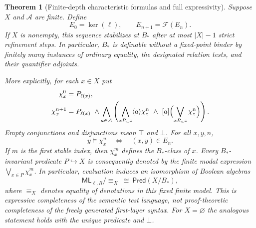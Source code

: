 \documentclass[11pt,a4paper]{article}
\numberwithin{equation}{section}
\newtheorem{theorem}{Theorem}[section]
\theoremstyle{definition}
\theoremstyle{remark}
\theoremstyle{plain}
\begin{document}
\begin{theorem}[Finite-depth characteristic formulas and full expressivity]
\label{thm:egt-finite-modal-completeness}
Suppose $X$ and $\mathcal A$ are finite. Define
\[
 E_0=\ker(\ell),\qquad E_{n+1}=\mathcal F(E_n).
\]
If $X$ is nonempty, this sequence stabilizes at $B_*$ after at most
$|X|-1$ strict refinement steps. In particular, $B_*$ is definable
without a fixed-point binder by finitely many instances of ordinary
equality, the designated relation tests, and their quantifier adjoints.

More explicitly, for each $x\in X$ put
\begin{align*}
 \chi_x^0&=P_{\ell(x)},\\
 \chi_x^{n+1}
 &=P_{\ell(x)}\ \wedge
 \bigwedge_{a\in\mathcal A}
 \left(
   \bigwedge_{xR_az}\langle a\rangle\chi_z^n
   \ \wedge\
   [a]\Bigl(\bigvee_{xR_az}\chi_z^n\Bigr)
 \right).
\end{align*}
Empty conjunctions and disjunctions mean $\top$ and $\bot$.
For all $x,y,n$,
\[
 y\models\chi_x^n\quad\Longleftrightarrow\quad (x,y)\in E_n.
\]
If $m$ is the first stable index, then $\chi_x^m$ defines the
$B_*$-class of $x$. Every $B_*$-invariant predicate
$P\hookrightarrow X$ is consequently denoted by the finite modal
expression $\bigvee_{x\in P}\chi_x^m$.
In particular, evaluation induces an isomorphism of Boolean algebras
\[
 \mathsf{ML}_{\ell,R}/{\equiv_X}\ \cong\ \mathsf{Pred}(X/B_*),
\]
where $\equiv_X$ denotes equality of denotations in this fixed
finite model. This is expressive completeness of the semantic test
language, not proof-theoretic completeness of the freely generated
first-layer syntax.
For $X=\varnothing$ the analogous statement holds with the unique
predicate and $\bot$.
\end{theorem}
\end{document}
